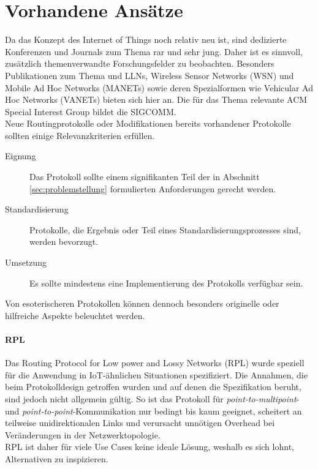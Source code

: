 \documentclass[10pt,a4paper,fleqn, twocolumn]{article}
\begin{document}
\section{Vorhandene Ansätze}
\label{sec:lsg}
Da das Konzept des Internet of Things noch relativ neu ist, sind dedizierte Konferenzen und Journals zum Thema rar und sehr jung. Daher ist es sinnvoll, zusätzlich themenverwandte Forschungsfelder zu beobachten. Besonders Publikationen zum Thema und LLNs, Wireless Sensor Networks (WSN) und Mobile Ad Hoc Networks (MANETs) sowie deren Spezialformen wie Vehicular Ad Hoc Networks (VANETs) bieten sich hier an. Die für das Thema relevante ACM Special Interest Group bildet die SIGCOMM.\\
Neue Routingprotokolle oder Modifikationen bereits vorhandener Protokolle sollten %
 einige Relevanzkriterien erfüllen.
\begin{description}
\item[Eignung] Das Protokoll sollte einem signifikanten Teil der in Abschnitt \ref{sec:problemstellung} formulierten Anforderungen gerecht werden.
\item[Standardisierung] Protokolle, die Ergebnis oder Teil eines Standardisierungsprozesses sind, werden bevorzugt.
\item[Umsetzung] Es sollte mindestens eine Implementierung des Protokolls verfügbar sein.
\end{description}
Von esoterischeren Protokollen können dennoch besonders originelle oder hilfreiche Aspekte beleuchtet werden.


\paragraph{RPL}
Das Routing Protocol for Low power and Lossy Networks (RPL)\cite{RFC6550} wurde speziell für die Anwendung in IoT-ähnlichen Situationen spezifiziert. Die Annahmen, die beim Protokolldesign getroffen wurden und auf denen die Spezifikation beruht, sind jedoch nicht allgemein gültig. So ist das Protokoll für \emph{point-to-multipoint}- und \emph{point-to-point}-Kommunikation nur bedingt bis kaum geeignet, scheitert an teilweise unidirektionalen Links und verursacht unnötigen Overhead bei Veränderungen in der Netzwerktopologie\cite{RPL_eval_critical}.\\ %
RPL ist daher für viele Use Cases keine ideale Lösung, weshalb es sich lohnt, Alternativen zu inspizieren.
\end{document}
